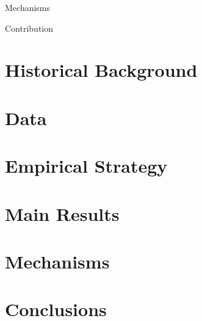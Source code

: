 \documentclass[dvipdfmx,11pt]{beamer}
\begin{document}
\begin{frame}{Mechanisms}
  
\end{frame}

\begin{frame}{Contribution}
  
\end{frame}

\section{Historical Background}
\frame{\sectionpage}

\section{Data}
\frame{\sectionpage}

\section{Empirical Strategy}
\frame{\sectionpage}

\section{Main Results}
\frame{\sectionpage}

\section{Mechanisms}
\frame{\sectionpage}

\section{Conclusions}
\frame{\sectionpage}
\end{document}
